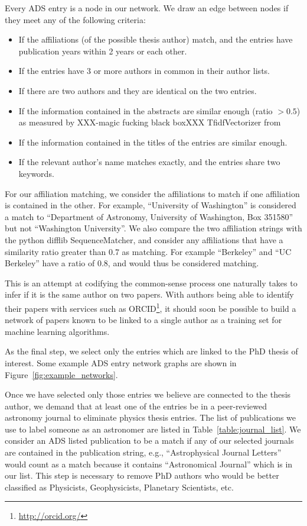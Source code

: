\documentclass[preprint2]{aastex}
\begin{document}
Every ADS entry is a node in our network. We draw an edge between nodes if they meet any of the following criteria:

\begin{itemize}
\item{If the affiliations (of the possible thesis author) match, and the entries have publication years within 2 years or each other.}
\item{If the entries have 3 or more authors in common in their author lists.}
\item{If there are two authors and they are identical on the two entries.}
\item{If the information contained in the abstracts are similar enough (ratio $> 0.5$) as measured by XXX-magic fucking black boxXXX TfidfVectorizer from \citet{scikit-learn}}
\item{If the information contained in the titles of the entries are similar enough.}
  \item{If the relevant author's name matches exactly, and the entries share two keywords.}
\end{itemize}

For our affiliation matching, we consider the affiliations to match if one affiliation is contained in the other.  For example, ``University of Washington'' is considered a match to ``Department of Astronomy, University of Washington, Box 351580'' but not ``Washington University''.  We also compare the two affiliation strings with the python difflib SequenceMatcher, and consider any affiliations that have a similarity ratio greater than 0.7 as matching.  For example ``Berkeley'' and ``UC Berkeley'' have a ratio of 0.8, and would thus be considered matching.

This is an attempt at codifying the common-sense process one naturally takes to infer if it is the same author on two papers. With authors being able to identify their papers with services such as ORCID\footnote{\url{http://orcid.org/}}, it should soon be possible to build a network of papers known to be linked to a single author as a training set for machine learning algorithms.  

As the final step, we select only the entries which are linked to the PhD thesis of interest.  Some example ADS entry network graphs are shown in Figure~\ref{fig:example_networks}.

Once we have selected only those entries we believe are connected to the thesis author, we demand that at least one of the entries be in a peer-reviewed astronomy journal to eliminate physics thesis entries.  The list of publications we use to label someone as an astronomer are listed in Table~\ref{table:journal_list}. We consider an ADS listed publication to be a match if any of our selected journals are contained in the publication string, e.g., ``Astrophysical Journal Letters'' would count as a match because it contains ``Astronomical Journal'' which is in our list.  This step is necessary to remove PhD authors who would be better classified as Physicists, Geophysicists, Planetary Scientists, etc. 
\end{document}
